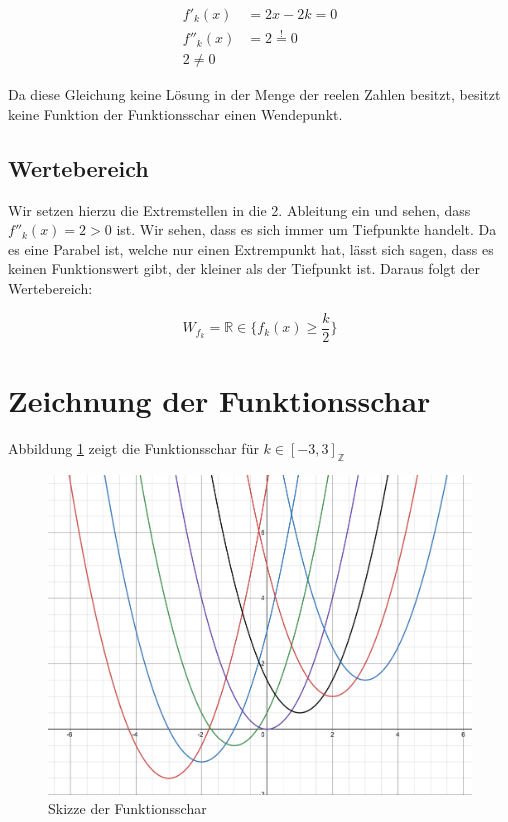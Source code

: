\documentclass[12pt,a4paper]{article}
\begin{document}
\begin{equation}
    \label{eq:ws}
    \begin{aligned}
        f'_k(x) &= 2x - 2k = 0 \\
        f''_k(x) &= 2 \overset{!}{=} 0 \\
        2 \ne 0
    \end{aligned}
\end{equation}

Da diese Gleichung keine Lösung in der Menge der reelen Zahlen besitzt, besitzt keine Funktion der Funktionsschar einen Wendepunkt.

\subsection {Wertebereich}

Wir setzen hierzu die Extremstellen in die 2. Ableitung ein und sehen, dass $f''_k(x) = 2 > 0$ ist. Wir sehen, dass es sich immer um Tiefpunkte handelt. Da es eine Parabel ist, welche nur einen Extrempunkt hat, lässt sich sagen, dass es keinen Funktionswert gibt, der kleiner als der Tiefpunkt ist. Daraus folgt der Wertebereich:

\begin{equation}
    \label{eq:wrtB}
    W_{f_k} = \mathbb{R} \in \{f_k(x) \ge \frac{k}{2}\}
\end{equation}

\section{Zeichnung der Funktionsschar}

Abbildung \ref{fig:draw} zeigt die Funktionsschar für  $k \in [-3, 3]_{\mathbb{Z}}$

\begin{figure}[h]
    \centering
    \includegraphics[width=1\textwidth]{./images/IMG_1615.jpg}
    \caption{Skizze der Funktionsschar}
    \label{fig:draw}
\end{figure}


\printbibliography[title={Literaturverzeichnis}]
\end{document}
